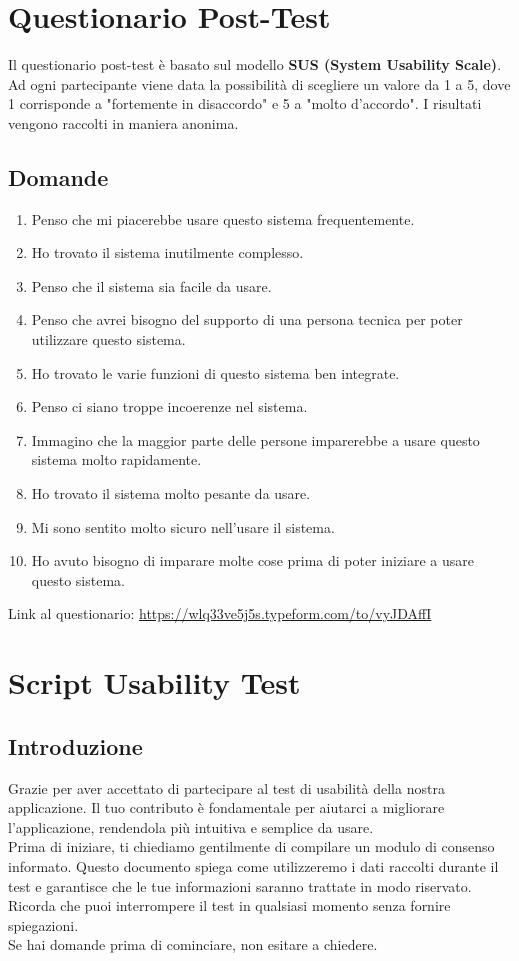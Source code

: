 \documentclass{article}
\begin{document}
\section{Questionario Post-Test}
Il questionario post-test \`e basato sul modello \textbf{SUS (System Usability Scale)}. Ad ogni partecipante viene data la possibilit\`a di scegliere un valore da 1 a 5, dove 1 corrisponde a "fortemente in disaccordo" e 5 a "molto d’accordo". I risultati vengono raccolti in maniera anonima.

\subsection*{Domande}
\begin{enumerate}
    \item Penso che mi piacerebbe usare questo sistema frequentemente.
    \item Ho trovato il sistema inutilmente complesso.
    \item Penso che il sistema sia facile da usare.
    \item Penso che avrei bisogno del supporto di una persona tecnica per poter utilizzare questo sistema.
    \item Ho trovato le varie funzioni di questo sistema ben integrate.
    \item Penso ci siano troppe incoerenze nel sistema.
    \item Immagino che la maggior parte delle persone imparerebbe a usare questo sistema molto rapidamente.
    \item Ho trovato il sistema molto pesante da usare.
    \item Mi sono sentito molto sicuro nell'usare il sistema.
    \item Ho avuto bisogno di imparare molte cose prima di poter iniziare a usare questo sistema.
\end{enumerate}

\noindent Link al questionario: \url{https://wlq33ve5j5s.typeform.com/to/vyJDAffI}

\section{Script Usability Test}
\subsection{Introduzione}
Grazie per aver accettato di partecipare al test di usabilità della nostra applicazione. Il tuo contributo è fondamentale per aiutarci a migliorare l'applicazione, rendendola più intuitiva e semplice da usare.\\
Prima di iniziare, ti chiediamo gentilmente di compilare un modulo di consenso informato. Questo documento spiega come utilizzeremo i dati raccolti durante il test e garantisce che le tue informazioni saranno trattate in modo riservato. Ricorda che puoi interrompere il test in qualsiasi momento senza fornire spiegazioni.\\
Se hai domande prima di cominciare, non esitare a chiedere.
\end{document}

